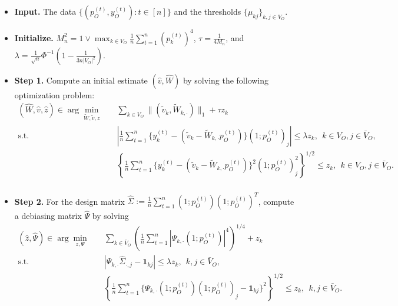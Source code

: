 \documentclass[opre,nonblindrev]{informs3} %
\def\tWkdot{\tilde W_{k,\cdot}}
\def\Pkdot{\Psi_{k,\cdot}}
\begin{document}
\begin{algorithm}[tbp]
	\begin{itemize}[leftmargin=*]
		\item[] {\bf Input.} The data $\{ ({p}^{(t)}_O, {y}_O^{(t)}) : 
		t\in[n]\}$ and the thresholds $\{ \mu_{kj}\}_{ k, j \in V_O}$.
		\item[] {\bf Initialize.}
		 $M_n^2= 1\vee \max_{k\in V_O}\frac{1}{n}\sum_{t=1}^n(p_k^{(t)})^4$, $\tau = \frac{1}{4M_n}$, and $\lambda = \frac{1}{\sqrt{n}}  \Phi^{-1}\left(1-\frac{1}{3n|V_O|^2}\right)$.
		

\item[] {\bf Step 1.}
		Compute an initial estimate $(\hat v,\hat W)$ by solving the following optimization problem:
		\begin{equation}\label{def:lasso}
		\begin{array}{rl}
		\displaystyle (\hat W, \hat v, \hat z) \in \arg\min_{\tilde W,\tilde v,z} \quad & 
		\sum_{k\in V_O} \| (\tilde v_k, \tilde W_{k,\cdot})\|_{1} + \tau z_k\\
\mathrm{s.t.} \quad & \left| \frac{1}{n}\sum_{t=1}^{n} \{y_k^{(t)} - (\tilde v_k-		\tWkdot p_O^{(t)})\}(1;p_O^{(t)})_j\right| \leq \lambda z_k, \ \ 
k\in V_O, j\in
\bar{V}_O,\\
		&  \left\{ \frac{1}{n}\sum_{t=1}^{n} \{y_k^{(t)} - (\tilde v_k-\tWkdot  p_O^{(t)})\}^2(1;p_O^{(t)})_j^2\right\}^{1/2} \leq z_k, \ \ k\in V_O, j\in
		\bar{V}_O.\\
		\end{array}
		\end{equation}
		
	
	\item[] {\bf Step 2.} For the design matrix $\hat\Sigma:= \frac{1}{n}\sum_{t=1}^n(1;p_O^{(t)})(1;p_O^{(t)})^T$, compute a debiasing matrix $\hat \Psi$ by solving
	\begin{equation}\label{def:lasso:ortho}
	\begin{array}{rl}
	\displaystyle  (\hat z, \hat \Psi) \in \arg\min_{z,\Psi} \quad  &  \sum_{k\in \bar{V}_O} \left(\frac{1}{n}\sum_{t=1}^n|\Pkdot
 (1;p_O^{(t)})|^4\right)^{1/4} +  z_k\\
	\mathrm{s.t.} \quad 	& |	\Pkdot  \hat\Sigma_{\cdot,j} - \mathbf{1}_{kj} | \leq \lambda z_k, \ \ k,j\in \bar{V}_O, \\
	&  \left\{ \frac{1}{n}\sum_{t=1}^{n} \{ \Pkdot(1;p_O^{(t)}) (1;p_O^{(t)})_j - \mathbf{1}_{kj}\}^2\right\}^{1/2} \leq z_k, \ \ k,j \in \bar{V}_O.\\
	\end{array}\end{equation}


\end{itemize}
\end{algorithm}
\end{document}
